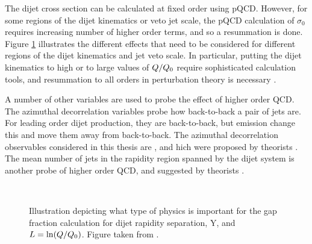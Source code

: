 The dijet cross section can be calculated at fixed order using pQCD.
However, for some regions of the dijet kinematics or veto jet scale, the pQCD calculation of $\sigma_{0}$ requires increasing number of higher order terms, and so a resummation is done.
Figure \ref{Theory:KineRange} illustrates the different effects that need to be considered for different regions of the dijet kinematics and jet veto scale.
In particular, putting the dijet kinematics to high \dy{} or to large values of $Q/\mbox{$Q_0$}{}$ require sophisticated calculation tools, and resummation to all orders in perturbation theory is necessary \cite{ref:Jeff3,ref:HEJ1}.

A number of other variables are used to probe the effect of higher order QCD.
The azimuthal decorrelation variables probe how back-to-back a pair of jets are.
For leading order dijet production, they are back-to-back, but emission change this and move them away from back-to-back.
The azimuthal decorrelation observables considered in this thesis are \dphiDist{}, \mean{\cosdphi{}} and  \mean{\costwodphi{}} hich were proposed by theorists  \cite{ref:BFKL,ref:BFKL_cos,ref:BFKL_dPhi,ref:Anderson1}.  
The mean number of jets in the rapidity region spanned by the dijet system is another probe of higher order QCD, and suggested by theorists \cite{ref:Andersen2}.



\begin{figure}
\centering
\mbox{
}
\caption[]{
Illustration depicting what type of physics is important for the gap fraction calculation for dijet rapidity separation, Y, and $L=\ln(Q/\mbox{$Q_0$}{})$.
Figure taken from \cite{ref:Forshaw_Veto}.
\label{Theory:KineRange}}
\end{figure}





